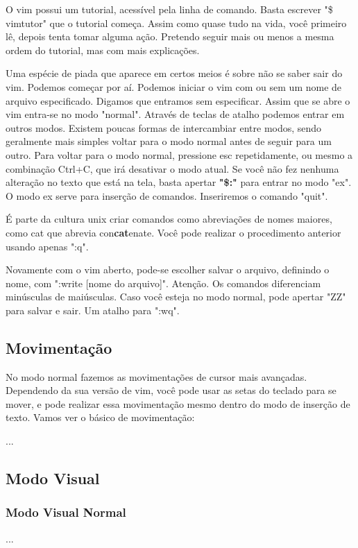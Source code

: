 \documentclass[a4paper, 12pt]{article}
\begin{document}
O vim possui um tutorial, acessível pela linha de comando.
Basta escrever "\$ vimtutor" que o tutorial começa.
Assim como quase tudo na vida, você primeiro lê, depois tenta tomar alguma ação.
Pretendo seguir mais ou menos a mesma ordem do tutorial, mas com mais explicações.

Uma espécie de piada que aparece em certos meios é sobre não se saber sair do vim.
Podemos começar por aí.
Podemos iniciar o vim com ou sem um nome de arquivo especificado.
Digamos que entramos sem especificar.
Assim que se abre o vim entra-se no modo "normal".
Através de teclas de atalho podemos entrar em outros modos.
Existem poucas formas de intercambiar entre modos, sendo geralmente mais simples voltar para o modo normal antes de seguir para um outro.
Para voltar para o modo normal, pressione esc repetidamente, ou mesmo a combinação Ctrl+C, que irá desativar o modo atual.
Se você não fez nenhuma alteração no texto que está na tela, basta apertar \textbf{"\$:"} para entrar no modo "ex".
O modo ex serve para inserção de comandos.
Inseriremos o comando "quit".

É parte da cultura unix criar comandos como abreviações de nomes maiores, como cat que abrevia con\textbf{cat}enate.
Você pode realizar o procedimento anterior usando apenas ":q".

Novamente com o vim aberto, pode-se escolher salvar o arquivo, definindo o nome, com ":write [nome do arquivo]".
Atenção. Os comandos diferenciam minúsculas de maiúsculas.
Caso você esteja no modo normal, pode apertar "ZZ" para salvar e sair. Um atalho para ":wq".


\subsection{Movimentação}
No modo normal fazemos as movimentações de cursor mais avançadas.
Dependendo da sua versão de vim, você pode usar as setas do teclado para se mover, e pode realizar essa movimentação mesmo dentro do modo de inserção de texto.
Vamos ver o básico de movimentação:

...
\subsection{Modo Visual}
\subsubsection{Modo Visual Normal}
...
\end{document}
